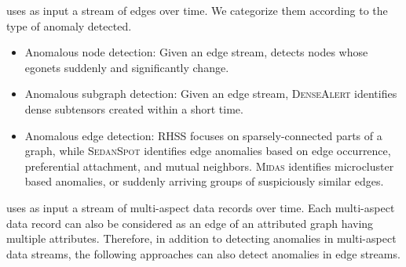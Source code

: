 \documentclass[sigconf]{acmart}
\begin{document}
 uses as input a stream of edges over time. We categorize them according to the type of anomaly detected.
\begin{itemize}
\item Anomalous node detection:
Given an edge stream, \cite{yu2013anomalous} detects nodes whose egonets suddenly and significantly change.
\item Anomalous subgraph detection:
Given an edge stream, \textsc{DenseAlert} \cite{shin2017densealert} identifies dense subtensors created within a short time.
\item Anomalous edge detection:
RHSS \cite{ranshous2016scalable} focuses on sparsely-connected parts of a graph, while \textsc{SedanSpot} \cite{eswaran2018sedanspot} identifies edge anomalies based on edge occurrence, preferential attachment, and mutual neighbors. \textsc{Midas} \cite{bhatia2020midas} identifies microcluster based anomalies, or suddenly arriving groups of suspiciously similar edges.
\end{itemize}

 uses as input a stream of multi-aspect data records over time. Each multi-aspect data record can also be considered as an edge of an attributed graph having multiple attributes. Therefore, in addition to detecting anomalies in multi-aspect data streams, the following approaches can also detect anomalies in edge streams.
\end{document}

